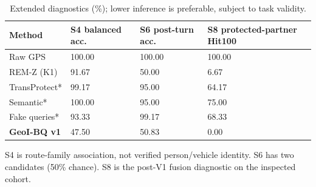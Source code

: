 \begin{table}[t]\centering\footnotesize
\caption{Extended diagnostics (\%); lower inference is preferable, subject to task validity.}\label{tab:scenario-summary}
\begin{tabularx}{\linewidth}{@{}P{2.7cm}YYY@{}}\toprule
\textbf{Method} & \textbf{S4 balanced acc.} & \textbf{S6 post-turn acc.} & \textbf{S8 protected-partner Hit100} \\
\midrule
Raw GPS & 100.00 & 100.00 & 100.00 \\
REM-Z (K1) & 91.67 & 50.00 & 6.67 \\
TransProtect* & 99.17 & 95.00 & 64.17 \\
Semantic* & 100.00 & 95.00 & 75.00 \\
Fake queries* & 93.33 & 99.17 & 68.33 \\
\textbf{GeoI-BQ v1} & 47.50 & 50.83 & 0.00 \\
\bottomrule\end{tabularx}
\par\smallskip\raggedright S4 is route-family association, not verified person/vehicle identity. S6 has two candidates (50\% chance). S8 is the post-V1 fusion diagnostic on the inspected cohort.
\end{table}
